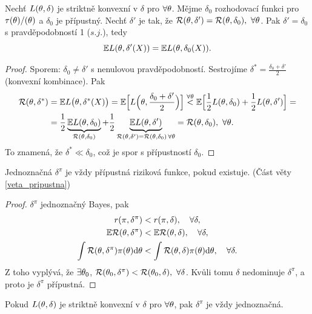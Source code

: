 \begin{theorem}\label{veta_rovnost}
	Nechť $L(\theta,\delta)$ je striktně konvexní v $\delta$ pro $\forall\theta$. Mějme $\delta_0$ rozhodovací funkci pro $\tau(\theta)/(\theta)$ a $\delta_0$ je přípustný. Nechť $\delta'$ je tak, že $\mathcal{R}(\theta,\delta')=\mathcal{R}(\theta,\delta_0),~\forall\theta$. Pak $\delta'=\delta_0$ s pravděpodobností 1 ($s.j.$), tedy $$ \mathbb{E} L(\theta,\delta'(X))=\mathbb{E} L(\theta,\delta_0(X)).$$
	\begin{proof}
		Sporem: $\delta_0\neq\delta'$ s nenulovou pravděpodobností. Sestrojíme $\delta^\ast=\frac{\delta_0+\delta'}{2}$ (konvexní kombinace). Pak
		\[
		\begin{split}
		\mathcal{R}(\theta,\delta^\ast)&=\mathbb{E} L\big(\theta,\delta^\ast(X)\big)=\mathbb{E}\Big[L\Big(\theta,\frac{\delta_0+\delta'}{2}\Big)\Big]\overset{\forall\theta}{<}\mathbb{E}\Big[\frac{1}{2}L(\theta,\delta_0)+\frac{1}{2}L(\theta,\delta')\Big]=\\&= \frac{1}{2}\underbrace{\mathbb{E} L(\theta,\delta_0)}_{\mathcal{R}(\theta,\delta_0)}+\frac{1}{2}\underbrace{\mathbb{E} L(\theta,\delta')}_{\mathcal{R}(\theta,\delta')=\mathcal{R}(\theta,\delta_0)\,\forall\theta}=\mathcal{R}(\theta,\delta_0),~\forall\theta.
		\end{split}
		\] 
		To znamená, že $\delta^\ast\ll\delta_0$, což je spor s přípustností $\delta_0$.
	\end{proof}
\end{theorem}
\begin{theorem} \label{veta_prip}
	Jednoznačná $\delta^\pi$ je vždy přípustná riziková funkce, pokud existuje. (Část věty \ref{veta_pripustna})
	\begin{proof}
		$\delta^\pi$ jednoznačný Bayes, pak \[
		\begin{split}
		r(\pi,\delta^\pi)&<r(\pi,\delta),\quad\forall\delta,\\
		\mathbb{E} \mathcal{R}(\theta,\delta^\pi)&<\mathbb{E} \mathcal{R}(\theta,\delta),\quad\forall\delta,\\
		\int\mathcal{R}(\theta,\delta^\pi)\pi(\theta)\mathrm{d}\theta&<\int\mathcal{R}(\theta,\delta)\pi(\theta)\mathrm{d}\theta,\quad\forall\delta.		
		\end{split}
		\]
		Z toho vyplývá, že $\exists\theta_0$, $\mathcal{R}(\theta_0,\delta^\pi)<\mathcal{R}(\theta_0,\delta),~\forall\delta$. Kvůli tomu $\delta$ nedominuje $\delta^\pi$, a proto je $\delta^\pi$ přípustná.
	\end{proof}
\end{theorem}
\begin{remark}
	Pokud $L(\theta,\delta)$ je striktně konvexní v $\delta$ pro $\forall\theta$, pak $\delta^\pi$ je vždy jednoznačná.
\end{remark}
